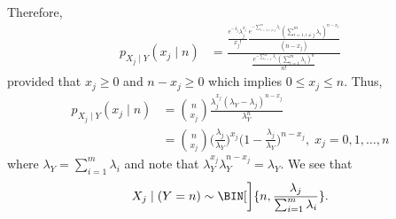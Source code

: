 \begin{Example}{}
    Therefore,
    \begin{align*}
        p_{X_j\mid Y}(x_j\mid n)
         & =\frac{\frac{e^{-\lambda_j}\lambda_j^{x_j}}{x_j!}\frac{e^{-\sum_{i=1,i\ne j}^{m} \lambda_i}(\sum_{i=1,i\ne j}^{m}\lambda_i)^{n-x_j}}{(n-x_j)}}{\frac{e^{-\sum_{i=1}^{m} \lambda_i}(\sum_{i=1}^{m} \lambda_i)^n}{n!}}
    \end{align*}
    provided that $ x_j\ge 0 $ and $ n-x_j\ge 0 $ which implies $ 0\le x_j\le n $. Thus,
    \begin{align*}
        p_{X_j\mid Y}(x_j\mid n)
         & =\binom{n}{x_j}\frac{\lambda_j^{x_j}(\lambda_Y-\lambda_j)^{n-x_j}}{\lambda_Y^n}                                                       \\
         & =\binom{n}{x_j}\biggl(\frac{\lambda_j}{\lambda_Y}\biggr)^{x_j}\biggl(1-\frac{\lambda_j}{\lambda_Y} \biggr)^{n-x_j},\;x_j=0,1,\ldots,n
    \end{align*}
    where $ \lambda_Y=\sum_{i=1}^{m} \lambda_i $ and note that $ \lambda_Y^{x_j}\lambda_Y^{n-x_j}=\lambda_Y $. We see that
    \[ X_j\mid (Y=n)\sim \BIN[\bigg]{n,\frac{\lambda_j}{\sum_{i=1}^{m} \lambda_i}}. \]
\end{Example}
